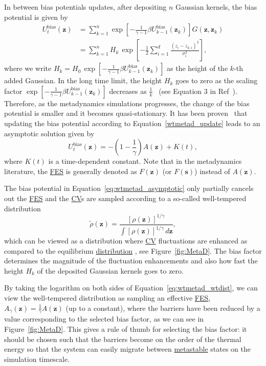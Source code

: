 \documentclass[9pt,review]{livecoms}
\newcommand{\vz}{\mathbf{z}}
\begin{document}
In between bias potentials updates, after depositing $n$ Gaussian kernels, the bias potential is given by
\begin{align}
\label{wtmetad_sum}
U_{t}^{\mathrm{bias}}(\vz) &=
\sum_{k=1}^{n}
\exp \left[-\frac{1}{\gamma-1} \beta  U^{\mathrm{bias}}_{k-1}(\vz_k)\right]
G(\vz,\vz_{k})
\nonumber
\\
& =
\sum_{k=1}^{n}
H_{k} \,
\exp \left[-\frac{1}{2}\sum^{d}_{i=1} \frac{(z_i-z_{k,i})^2}{\sigma^2_i} \right],
\end{align}
where we write $H_{k} = H_{0} \, \exp \left[-\frac{1}{\gamma-1} \beta U^{\mathrm{bias}}_{k-1}(\vz_k)\right]$ as the height of the $k$-th added Gaussian.
In the long time limit, the height $H_k$ goes to zero as the scaling factor $\exp \left[-\frac{1}{\gamma-1} \beta U^{\mathrm{bias}}_{k-1}(\vz_k)   \right]$ decreases as $\frac{1}{k}$~\cite{Barducci-PRL-2008,Dama-PRL-2014} (see Equation 3 in Ref~\cite{Barducci-PRL-2008}). Therefore, as the metadynamics simulations progresses, the change of the bias potential is smaller and it becomes quasi-stationary.
It has been proven~\cite{Dama-PRL-2014} that updating the bias potential according to Equation~\ref{wtmetad_update} leads to an asymptotic solution given by
\begin{equation}
\label{eq:wtmetad_asymptotic}
U_{t}^{\mathrm{bias}}(\vz) = - \left(1-\frac{1}{\gamma} \right)
A(\vz) + K(t),
\end{equation}
where $K(t)$ is a time-dependent constant.
Note that in the metadynamics literature, the \hyperlink{ref:FES} {FES} is generally denoted as $F(\vz)$ (or $F(\mathbf{s})$) instead of $A(\vz)$.


The bias potential in Equation~\ref{eq:wtmetad_asymptotic} only partially cancels out the \hyperlink{ref:FES} {FES} and the \hyperlink{ref:CV} {CV}s  are sampled according to a so-called well-tempered distribution
\begin{equation}
\label{eq:wtmetad_wtdist}
\tilde{\rho}(\vz) =
\frac
{[\rho(\vz)]^{1/\gamma}}
{\int [\rho(\vz)]^{1/\gamma} \, d\vz},
\end{equation}
which can be viewed as a distribution where \hyperlink{ref:CV} {CV} fluctuations are enhanced as compared to the equilibrium \hyperlink{ref:Distribution} {distribution} , see Figure~\ref{fig:MetaD}. The bias factor determines the magnitude of the fluctuation enhancements and also how fast the height $H_{k}$ of the deposited Gaussian kernels goes to zero.

By taking the logarithm on both sides of Equation~\ref{eq:wtmetad_wtdist}, we can view the well-tempered distribution as sampling an effective \hyperlink{ref:FES} {FES},  $A_{\gamma}(\vz) = \frac{1}{\gamma} A(\vz)$ (up to a constant), where the barriers have been reduced by a value corresponding to the selected bias factor, as we can see in Figure~\ref{fig:MetaD}. This gives a rule of thumb for selecting the bias factor: it should be chosen such that the barriers become on the order of the thermal energy so that the system can easily migrate between \hyperlink{ref:metastab} {metastable} states on the simulation timescale.
\end{document}
